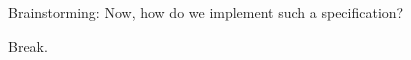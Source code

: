 \begin{assignment}
	\begin{task}
	Brainstorming: Now, how do we implement such a specification?
	\end{task}
\end{assignment}

\begin{assignment}
	\begin{task}
	Break.
	\end{task}
\end{assignment}




\nocite{raab2017introducing}

\appendix

\begin{frame}[allowframebreaks]
	
	
\end{frame}




